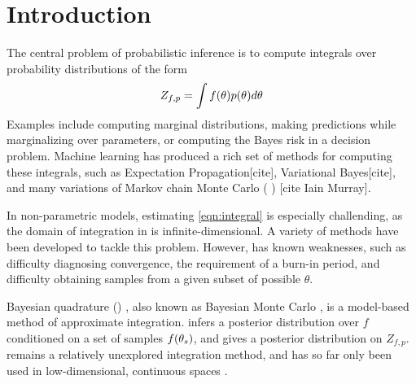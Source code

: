 \section{Introduction}

The central problem of probabilistic inference is to compute integrals over probability distributions of the form
\begin{equation}
	Z_{f,p} = \int f(\theta) p(\theta) d\theta
	\label{eqn:integral}
\end{equation}
Examples include computing marginal distributions, making predictions while marginalizing over parameters, or computing the Bayes risk in a decision problem.  Machine learning has produced a rich set of methods for computing these integrals, such as Expectation Propagation[cite], Variational Bayes[cite], and many variations of Markov chain Monte Carlo (\mcmc{} ) [cite Iain Murray].  

In non-parametric models, estimating \eqref{eqn:integral} is especially challending, as the domain of integration in is infinite-dimensional.  A variety of \mcmc{} methods have been developed to tackle this problem.  However, \mcmc{} has known weaknesses, such as difficulty diagnosing convergence, the requirement of a burn-in period, and difficulty obtaining samples from a given subset of possible $\theta$.

%


Bayesian quadrature (\bq{}) \cite{BZHermiteQuadrature}, also known as Bayesian Monte Carlo \cite{BZMonteCarlo}, is a model-based method of approximate integration.  \bq{} infers a posterior distribution over $f$ conditioned on a set of samples $f({\bf{\theta}}_s)$, and gives a posterior distribution on $Z_{f,p}$.  \bq{} remains a relatively unexplored integration method, and has so far only been used in low-dimensional, continuous spaces \cite{BZMonteCarlo}.

